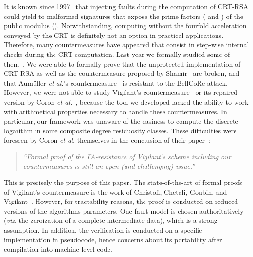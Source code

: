 \documentclass[10pt]{article}
\theoremstyle{definition}
\theoremstyle{theorem}
\newcommand{\etal}{\textit{et al.}\xspace}
\begin{document}
It is known since 1997~\cite{boneh-fault} that injecting faults during the computation of CRT-RSA could yield to malformed signatures that expose the prime factors ( and ) of the public modulus ().
Notwithstanding, computing without the fourfold acceleration conveyed by the CRT is definitely not an option in practical applications.
Therefore, many countermeasures have appeared that consist in step-wise internal checks during the CRT computation.
Last year we formally studied some of them~\cite{cryptoeprint:2013:506}.
We were able to formally prove that the unprotected implementation of CRT-RSA as well as the countermeasure proposed by Shamir~\cite{shamir-patent-rsa-crt} are broken, and that Aumüller \etal's countermeasure~\cite{DBLP:conf/ches/AumullerBFHS02} is resistant to the BellCoRe attack.
However, we were not able to study Vigilant's countermeasure~\cite{patent-vigilant_crtrsa,DBLP:conf/ches/Vigilant08} or its repaired version by Coron \etal~\cite{DBLP:conf/fdtc/CoronGMPV10}, because the tool we developed lacked the ability to work with arithmetical properties necessary to handle these countermeasures.
In particular, our framework was unaware of the easiness to compute the discrete logarithm in some composite degree residuosity classes. These difficulties were foreseen by Coron \etal themselves in the conclusion of their paper~\cite{DBLP:conf/fdtc/CoronGMPV10}:
\begin{quote}
\emph{``Formal proof of the FA-resistance of Vigilant's scheme including our countermeasures is still an open (and challenging) issue.''}
\end{quote}

This is precisely the purpose of this paper.
The state-of-the-art of formal proofs of Vigilant's countermeasure is the work of Christofi, Chetali, Goubin, and Vigilant~\cite{JCEN-Christofi13}.
However, for tractability reasons, the proof is conducted on reduced versions of the algorithms parameters.
One fault model is chosen authoritatively (\emph{viz}. the zeroization of a complete intermediate data), which is a strong assumption.
In addition, the verification is conducted on a specific implementation in pseudocode, hence concerns about its portability after compilation into machine-level code.
\end{document}
